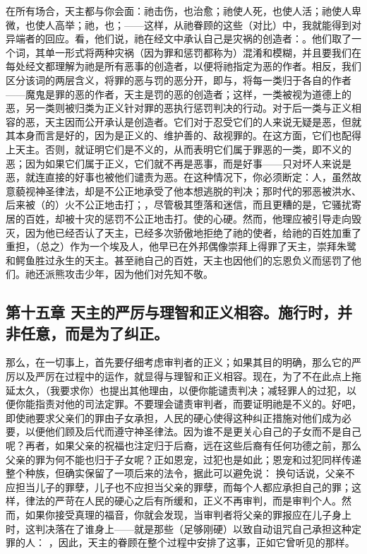 在所有场合，天主都与你会面：祂击伤，也治愈；祂使人死，也使人活；祂使人卑微，也使人高举；祂，也；——这样，从祂眷顾的这些（对比）中，我就能得到对异端者的回应。看，他们说，祂在经文中承认自己是灾祸的创造者：。他们取了一个词，其单一形式将两种灾祸（因为罪和惩罚都称为）混淆和模糊，并且要我们在每处经文都理解为祂是所有恶事的创造者，以便将祂指定为恶的作者。相反，我们区分该词的两层含义，将罪的恶与罚的恶分开，即与，将每一类归于各自的作者——魔鬼是罪的恶的作者，天主是罚的恶的创造者；这样，一类被视为道德上的恶，另一类则被归类为正义针对罪的恶执行惩罚判决的行动。对于后一类与正义相容的恶，天主因而公开承认是创造者。它们对于忍受它们的人来说无疑是恶，但就其本身而言是好的，因为是正义的、维护善的、敌视罪的。在这方面，它们也配得上天主。否则，就证明它们是不义的，从而表明它们属于罪恶的一类，即不义的恶；因为如果它们属于正义，它们就不再是恶事，而是好事——只对坏人来说是恶，就连直接的好事也被他们谴责为恶。在这种情况下，你必须断定：人，虽然故意藐视神圣律法，却是不公正地承受了他本想逃脱的判决；那时代的邪恶被洪水、后来被（的）火不公正地击打；，尽管极其堕落和迷信，而且更糟的是，它骚扰寄居的百姓，却被十灾的惩罚不公正地击打。使的心硬。然而，他理应被引导走向毁灭，因为他已经否认了天主，已经多次骄傲地拒绝了祂的使者，给祂的百姓加重了重担，（总之）作为一个埃及人，他早已在外邦偶像崇拜上得罪了天主，崇拜朱鹭和鳄鱼胜过永生的天主。甚至祂自己的百姓，天主也因他们的忘恩负义而惩罚了他们。祂还派熊攻击少年，因为他们对先知不敬。\par


\subsection{第十五章 天主的严厉与理智和正义相容。施行时，并非任意，而是为了纠正。}

那么，在一切事上，首先要仔细考虑审判者的正义；如果其目的明确，那么它的严厉以及严厉在过程中的运作，就显得与理智和正义相容。现在，为了不在此点上拖延太久，（我要求你）也提出其他理由，以便你能谴责判决；减轻罪人的过犯，以便你能指责对他的司法定罪。不要理会谴责审判者，而要证明祂是不义的。好吧，即使祂要求父亲们的罪由子女承担，人民的硬心使得这种纠正措施对他们成为必要，以便他们顾及后代而遵守神圣律法。因为谁不是更关心自己的子女而不是自己呢？再者，如果父亲的祝福也注定归于后裔，远在这些后裔有任何功德之前，那么父亲的罪为何不能也归于子女呢？正如恩宠，过犯也是如此；恩宠和过犯同样传递整个种族，但确实保留了一项后来的法令，据此可以避免说：  换句话说，父亲不应担当儿子的罪孽，儿子也不应担当父亲的罪孽，而每个人都应承担自己的罪；这样，律法的严苛在人民的硬心之后有所缓和，正义不再审判，而是审判个人。然而，如果你接受真理的福音，你就会发现，当审判者将父亲的罪报应在儿子身上时，这判决落在了谁身上——就是那些（足够刚硬）以致自动诅咒自己承担这种定罪的人：  ，因此，天主的眷顾在整个过程中安排了这事，正如它曾听见的那样。\par

